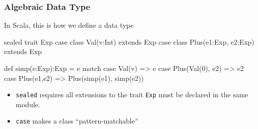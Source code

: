 \documentclass{beamer}
\newcommand{\ignore}[1]{}
\newcommand{\beb}{\begin{exampleblock}}
\newcommand{\eeb}{\end{exampleblock}}
\begin{document}
\ignore{ %
\begin{frame}[fragile]
\frametitle{Algebraic Data Type}
Recall the Haskell example
\beb{}
\begin{code}
data Exp =  Val Int |  Plus Exp Exp 

simp :: Exp -> Exp 
simp e@(Val v) = e
simp (Plus (Val 0) e2) = e2
simp (Plus e1 e2) = Plus (simp e1) (simp e2)
\end{code}
\eeb
\end{frame}
\begin{frame}[fragile]
\frametitle{Algebraic Data Type}
Let's rewrite in GADT style
\beb{}
\begin{code}
data Exp where
    Val  :: Int -> Exp
    Plus :: Exp -> Exp -> Exp

simp :: Exp -> Exp 
simp e@(Val v) = e
simp (Plus (Val 0) e2) = e2
simp (Plus e1 e2) = Plus (simp e1) (simp e2)
\end{code}
\eeb
\end{frame}
}
\begin{frame}[fragile]
\frametitle{Algebraic Data Type} 
In Scala, this is how we define a data type
\beb{}
\begin{code}
sealed trait Exp
case class Val(v:Int) extends Exp
case class Plus(e1:Exp, e2:Exp) extends Exp

def simp(e:Exp):Exp = e match {
   case Val(v) => e
   case Plus(Val(0), e2) => e2
   case Plus(e1,e2) => Plus(simp(e1), simp(e2))
}
\end{code}
\eeb
\begin{itemize}
 \item {\tt sealed} requires all extensions to the trait {\tt Exp} must be
   declared in the same module.
 \item {\tt case} makes a class ``pattern-matchable''
\end{itemize}
\end{frame}
\end{document}
